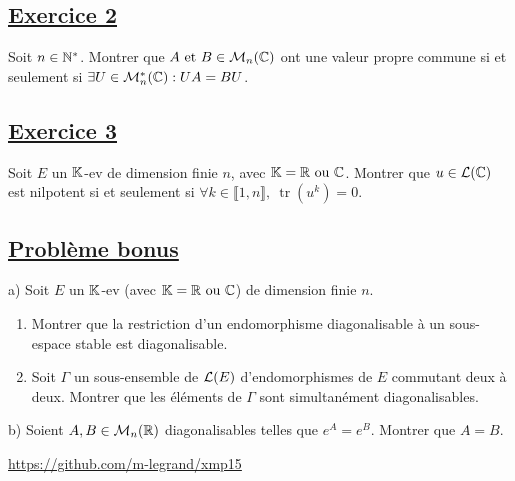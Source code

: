 \documentclass[12pt,a4paper]{report}
\DeclareMathOperator{\tr}{tr}
\begin{document}
\subsection*{\underline{Exercice 2}} %

Soit $n\in\mathbb{N}^*$. Montrer que $A\text{ et }B\in\mathcal{M}_n(\mathbb{C})$ ont une valeur propre commune si et seulement si $\exists U\in\mathcal{M}_n^*(\mathbb{C}) : UA=BU$.

\subsection*{\underline{Exercice 3}} %

Soit $E$ un $\mathbb{K}$-ev de dimension finie $n$, avec $\mathbb{K}=\mathbb{R}\text{ ou }\mathbb{C}$. Montrer que $u\in\mathcal{L} (\mathbb{C})$ est nilpotent si et seulement si $\forall k\in \llbracket 1,n\rrbracket ,\ \tr(u^k) = 0$.

\subsection*{\underline{Problème bonus}} %

\noindent a) Soit $E$ un $\mathbb{K}$-ev (avec $\mathbb{K}=\mathbb{R}\text{ ou }\mathbb{C}$) de dimension finie $n$.
\begin{enumerate}
\item Montrer que la restriction d'un endomorphisme diagonalisable à un sous-espace stable est diagonalisable.
\item Soit $\Gamma$ un sous-ensemble de $\mathcal{L}(E)$ d'endomorphismes de $E$ commutant deux à deux. Montrer que les éléments de $\Gamma$ sont simultanément diagonalisables.\\
\end{enumerate}

\noindent b) Soient $A,B\in\mathcal{M}_n(\mathbb{R})$ diagonalisables telles que $e^A=e^B$. Montrer que $A=B$.

\vfill

\begin{center}
\url{https://github.com/m-legrand/xmp15}
\end{center}
\end{document}
